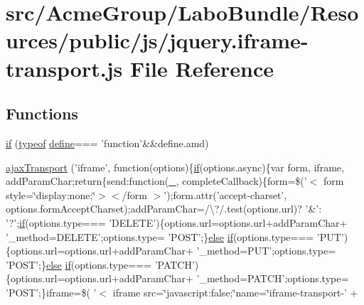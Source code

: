 \hypertarget{jquery_8iframe-transport_8js}{\section{src/\+Acme\+Group/\+Labo\+Bundle/\+Resources/public/js/jquery.iframe-\/transport.js File Reference}
\label{jquery_8iframe-transport_8js}
}
\subsection*{Functions}
\begin{DoxyCompactItemize}
\item 
\hyperlink{jquery_8iframe-transport_8js_a55bf8e12339412d59e0a999214324127}{if} (\hyperlink{extras_2_scroller_2media_2docs_2media_2js_2sh_brush_j_script_8js_a93a9266f92d6d68644e7aa63da3caa11}{typeof} \hyperlink{tinymce_8js_a86a0e277e82d8a0d8be415badd12eebc}{define}=== 'function'\&\&define.\+amd)
\item 
\hyperlink{jquery_8iframe-transport_8js_afe4c1b53ee240e8d16da7c9631153310}{ajax\+Transport} ('iframe', function(options)\{\hyperlink{fullpage_2plugin_8js_a8b98017e64ef036adb9ae327ff94abe1}{if}(options.\+async)\{var form, iframe, add\+Param\+Char;return\{send\+:function(\hyperlink{api_8methods_8js_a9fa21cf6b20968a71a2ed8acf4954e9e}{\+\_\+}, complete\+Callback)\{form=\$('$<$ form style=\char`\"{}display\+:none;\char`\"{}$>$$<$/form $>$');form.\+attr('accept-\/charset', options.\+form\+Accept\+Charset);add\+Param\+Char=/\textbackslash{}?/.test(options.\+url)? '\&'\+: '?';\hyperlink{fullpage_2plugin_8js_a8b98017e64ef036adb9ae327ff94abe1}{if}(options.\+type=== 'D\+E\+L\+E\+T\+E')\{options.\+url=options.\+url+add\+Param\+Char+ '\+\_\+method=D\+E\+L\+E\+T\+E';options.\+type= 'P\+O\+S\+T';\}\hyperlink{jquery_8iframe-transport_8js_a0544c3fe466e421738dae463968b70ba}{else} \hyperlink{fullpage_2plugin_8js_a8b98017e64ef036adb9ae327ff94abe1}{if}(options.\+type=== 'P\+U\+T')\{options.\+url=options.\+url+add\+Param\+Char+ '\+\_\+method=P\+U\+T';options.\+type= 'P\+O\+S\+T';\}\hyperlink{jquery_8iframe-transport_8js_a0544c3fe466e421738dae463968b70ba}{else} \hyperlink{fullpage_2plugin_8js_a8b98017e64ef036adb9ae327ff94abe1}{if}(options.\+type=== 'P\+A\+T\+C\+H')\{options.\+url=options.\+url+add\+Param\+Char+ '\+\_\+method=P\+A\+T\+C\+H';options.\+type= 'P\+O\+S\+T';\}iframe=\$( '$<$ iframe src=\char`\"{}javascript\+:false;\char`\"{}name=\char`\"{}iframe-\/transport-\/' +
$$
\end{DoxyCompactItemize}
